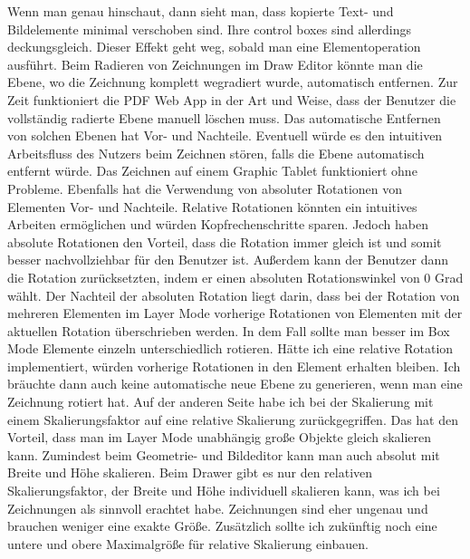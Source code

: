 Wenn man genau hinschaut, dann sieht man, dass kopierte Text- und Bildelemente minimal verschoben sind. Ihre control boxes sind allerdings deckungsgleich. Dieser Effekt geht weg, sobald man eine Elementoperation ausführt. Beim Radieren von Zeichnungen im Draw Editor könnte man die Ebene, wo die Zeichnung komplett wegradiert wurde, automatisch entfernen. Zur Zeit funktioniert die PDF Web App in der Art und Weise, dass der Benutzer die vollständig radierte Ebene manuell löschen muss. Das automatische Entfernen von solchen Ebenen hat Vor- und Nachteile. Eventuell würde es den intuitiven Arbeitsfluss des Nutzers beim Zeichnen stören, falls die Ebene automatisch entfernt würde. Das Zeichnen auf einem Graphic Tablet funktioniert ohne Probleme. Ebenfalls hat die Verwendung von absoluter Rotationen von Elementen Vor- und Nachteile. Relative Rotationen könnten ein intuitives Arbeiten ermöglichen und würden Kopfrechenschritte sparen. Jedoch haben absolute Rotationen den Vorteil, dass die Rotation immer gleich ist und somit besser nachvollziehbar für den Benutzer ist. Außerdem kann der Benutzer dann die Rotation zurücksetzten, indem er einen absoluten Rotationswinkel von 0 Grad wählt. Der Nachteil der absoluten Rotation liegt darin, dass bei der Rotation von mehreren Elementen im Layer Mode vorherige Rotationen von Elementen mit der aktuellen Rotation überschrieben werden. In dem Fall sollte man besser im Box Mode Elemente einzeln unterschiedlich rotieren. Hätte ich eine relative Rotation implementiert, würden vorherige Rotationen in den Element erhalten bleiben. Ich bräuchte dann auch keine automatische neue Ebene zu generieren, wenn man eine Zeichnung rotiert hat. Auf der anderen Seite habe ich bei der Skalierung mit einem Skalierungsfaktor auf eine relative Skalierung zurückgegriffen. Das hat den Vorteil, dass man im Layer Mode unabhängig große Objekte gleich skalieren kann. Zumindest beim Geometrie- und Bildeditor kann man auch absolut mit Breite und Höhe skalieren. Beim Drawer gibt es nur den relativen Skalierungsfaktor, der Breite und Höhe individuell skalieren kann, was ich bei Zeichnungen als sinnvoll erachtet habe. Zeichnungen sind eher ungenau und brauchen weniger eine exakte Größe. Zusätzlich sollte ich zukünftig noch eine untere und obere Maximalgröße für relative Skalierung einbauen. 
\par
